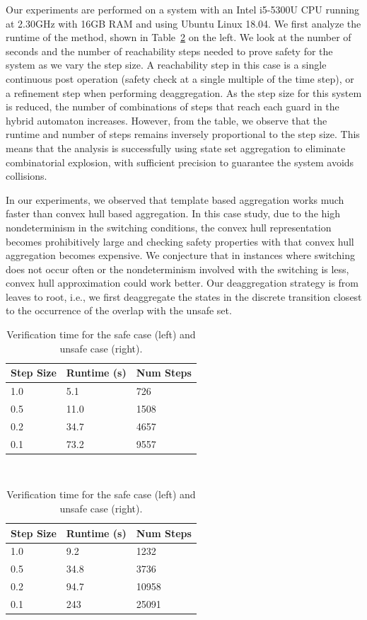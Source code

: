 Our experiments are performed on a system with an Intel i5-5300U CPU running at 2.30GHz with 16GB RAM and using Ubuntu Linux 18.04.
%
We first analyze the runtime of the method, shown in Table~\ref{tab:runtime} on the left.
%
We look at the number of seconds and the number of reachability steps needed to prove safety for the system as we vary the step size.
%
A reachability step in this case is a single continuous post operation (safety check at a single multiple of the time step), or a refinement step when performing deaggregation.
%
As the step size for this system is reduced, the number of combinations of steps that reach each guard in the hybrid automaton increases.
%
However, from the table, we observe that the runtime and number of steps remains inversely proportional to the step size.
%
This means that the analysis is successfully using state set aggregation to eliminate combinatorial explosion, with sufficient
precision to guarantee the system avoids collisions. 

In our experiments, we observed that template based aggregation works much faster than convex hull based aggregation. In this case study, due to the high nondeterminism in the switching conditions, the convex hull representation becomes prohibitively large and checking safety properties with that convex hull aggregation becomes expensive. We conjecture that in instances where switching does not occur often or the nondeterminism involved with the switching is less, convex hull approximation could work better.
Our deaggregation strategy is from leaves to root, i.e., we first deaggregate the states in the discrete transition closest to the occurrence of the overlap with the unsafe set.


\setlength{\tabcolsep}{2pt}
\begin{table}[t]
\caption{Verification time for the safe case (left) and unsafe case (right).}
\label{tab:runtime}
\centering
\setlength{\aboverulesep}{0.0pt}
\setlength{\belowrulesep}{0.0pt}
\setlength{\extrarowheight}{.0ex}
\begin{tabular}{@{}lll@{}}
  \toprule
  Step Size & Runtime (s) & Num Steps \\
  \midrule
  1.0 & 5.1 & 726 \\
  0.5 & 11.0 & 1508 \\
  0.2 & 34.7 & 4657 \\
  0.1 & 73.2 & 9557 \\
\bottomrule
\end{tabular}
~~~~~~~~
\begin{tabular}{@{}lll@{}}
  \toprule
  Step Size & Runtime (s) & Num Steps \\
  \midrule
  1.0 & 9.2 & 1232 \\
  0.5 & 34.8 & 3736 \\
  0.2 & 94.7 & 10958 \\
  0.1 & 243 & 25091 \\
\bottomrule
\end{tabular}
\end{table}

